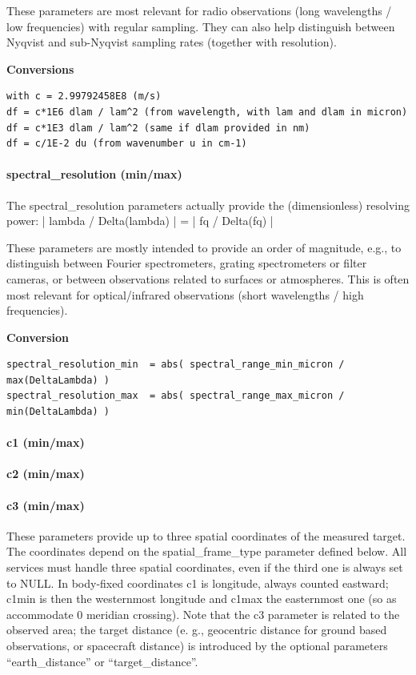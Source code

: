 \documentclass[11pt,a4paper]{ivoa}
\begin{document}
These parameters are most relevant for radio observations (long wavelengths / low frequencies) with regular sampling. They can also help distinguish between Nyqvist and sub-Nyqvist sampling rates (together with resolution).


\textbf{Conversions}

\begin{verbatim}
with c = 2.99792458E8 (m/s)
df = c*1E6 dlam / lam^2 (from wavelength, with lam and dlam in micron)
df = c*1E3 dlam / lam^2 (same if dlam provided in nm)
df = c/1E-2 du (from wavenumber u in cm-1)
\end{verbatim}

\paragraph{spectral\_resolution (min/max)}

The spectral\_resolution parameters actually provide the (dimensionless) resolving power: | lambda / Delta(lambda) | = | fq / Delta(fq) |  

These parameters are mostly intended to provide an order of magnitude, e.g., to distinguish between Fourier spectrometers, grating spectrometers or filter cameras, or between observations related to surfaces or atmospheres. This is often most relevant for optical/infrared observations (short wavelengths / high frequencies).


\textbf{Conversion}

\begin{verbatim}
spectral_resolution_min  = abs( spectral_range_min_micron / max(DeltaLambda) )
spectral_resolution_max  = abs( spectral_range_max_micron / min(DeltaLambda) )
\end{verbatim}

\paragraph{c1 (min/max)}

\paragraph{c2 (min/max)}

\paragraph{c3 (min/max)}

These parameters provide up to three spatial coordinates of the measured target. The coordinates depend on the spatial\_frame\_type parameter defined below. All services must handle three spatial coordinates, even if the third one is always set to NULL. In body-fixed coordinates c1 is longitude, always counted eastward; c1min is then the westernmost longitude and c1max the easternmost one (so as accommodate 0 meridian crossing). Note that the c3 parameter is related to the observed area; the target distance (e. g., geocentric distance for ground based observations, or spacecraft distance) is introduced by the optional parameters  ``earth\_distance'' or ``target\_distance''.
\end{document}
